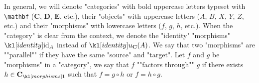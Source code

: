 \documentclass[main.tex]{subfiles}
\begin{document}
\begin{rem}[Notation]
	In general, we will denote "categories" with bold uppercase letters typeset with \verb!\mathbf! ($\mathbf{C}$, $\mathbf{D}$, $\mathbf{E}$, etc.), their "objects" with uppercase letters ($A$, $B$, $X$, $Y$, $Z$, etc.) and their "morphisms" with lowercase letters ($f$, $g$, $h$, etc.). When the "category" is clear from the context, we denote the "identity" "morphisms" $\id_A$ instead of $\idu_{\mathbf{C}}(A)$. \AP We say that two "morphisms" are ""parallel"" if they have the same "source" and "target". \AP Let $f$ and $g$ be "morphisms" in a "category", we say that $f$ ""factors through"" $g$ if there exists $h\in \mor{\mathbf{C}}$ such that $f = g \circ h$ or $f = h \circ g$.
\end{rem}
\end{document}
